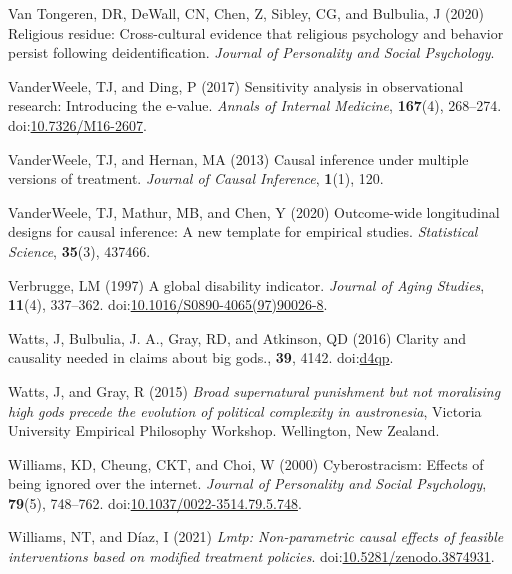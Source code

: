 \documentclass[
  single column]{article}
\newlength{\cslhangindent}
\newenvironment{CSLReferences}[2] %
 {\begin{list}{}{%
  \setlength{\itemindent}{0pt}
  \setlength{\leftmargin}{0pt}
  \setlength{\parsep}{0pt}
  \ifodd #1
   \setlength{\leftmargin}{\cslhangindent}
   \setlength{\itemindent}{-1\cslhangindent}
  \fi
  \setlength{\itemsep}{#2\baselineskip}}}
 {\end{list}}
\begin{document}
\begin{CSLReferences}{1}{0}
Van Tongeren, DR, DeWall, CN, Chen, Z, Sibley, CG, and Bulbulia, J
(2020) Religious residue: Cross-cultural evidence that religious
psychology and behavior persist following deidentification.
\emph{Journal of Personality and Social Psychology}.

VanderWeele, TJ, and Ding, P (2017) Sensitivity analysis in
observational research: Introducing the e-value. \emph{Annals of
Internal Medicine}, \textbf{167}(4), 268--274.
doi:\href{https://doi.org/10.7326/M16-2607}{10.7326/M16-2607}.

VanderWeele, TJ, and Hernan, MA (2013) Causal inference under multiple
versions of treatment. \emph{Journal of Causal Inference},
\textbf{1}(1), 120.

VanderWeele, TJ, Mathur, MB, and Chen, Y (2020) Outcome-wide
longitudinal designs for causal inference: A new template for empirical
studies. \emph{Statistical Science}, \textbf{35}(3), 437466.

Verbrugge, LM (1997) A global disability indicator. \emph{Journal of
Aging Studies}, \textbf{11}(4), 337--362.
doi:\href{https://doi.org/10.1016/S0890-4065(97)90026-8}{10.1016/S0890-4065(97)90026-8}.

Watts, J, Bulbulia, J. A., Gray, RD, and Atkinson, QD (2016) Clarity and
causality needed in claims about big gods., \textbf{39}, 4142.
doi:\href{https://doi.org/d4qp}{d4qp}.

Watts, J, and Gray, R (2015) \emph{Broad supernatural punishment but not
moralising high gods precede the evolution of political complexity in
austronesia}, Victoria University Empirical Philosophy Workshop.
Wellington, New Zealand.

Williams, KD, Cheung, CKT, and Choi, W (2000) Cyberostracism: Effects of
being ignored over the internet. \emph{Journal of Personality and Social
Psychology}, \textbf{79}(5), 748--762.
doi:\href{https://doi.org/10.1037/0022-3514.79.5.748}{10.1037/0022-3514.79.5.748}.

Williams, NT, and Díaz, I (2021) \emph{Lmtp: Non-parametric causal
effects of feasible interventions based on modified treatment policies}.
doi:\href{https://doi.org/10.5281/zenodo.3874931}{10.5281/zenodo.3874931}.

\end{CSLReferences}
\end{document}
